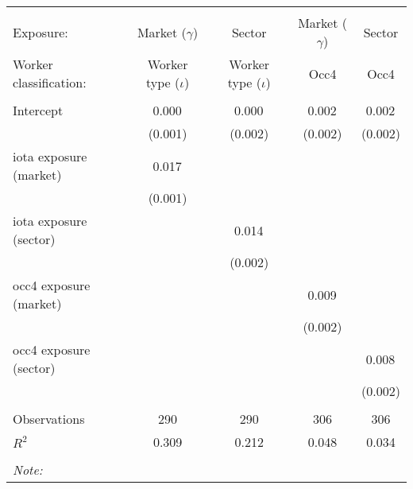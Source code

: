 \begin{tabular}{@{\extracolsep{5pt}}lcccc}
\\[-1.8ex]\hline
\hline \\[-1.8ex]
\hline \\[-1.8ex]
 Exposure: & Market ($\gamma$) & Sector & Market ($\gamma$) & Sector \\
 Worker classification: & Worker type ($\iota$) & Worker type ($\iota$) & Occ4 & Occ4 \\
 \hline &  &  &  &  \\
 Intercept & 0.000$^{}$ & 0.000$^{}$ & 0.002$^{}$ & 0.002$^{}$ \\
  & (0.001) & (0.002) & (0.002) & (0.002) \\
 iota exposure (market) & 0.017$^{}$ & & & \\
  & (0.001) & & & \\
 iota exposure (sector) & & 0.014$^{}$ & & \\
  & & (0.002) & & \\
 occ4 exposure (market) & & & 0.009$^{}$ & \\
  & & & (0.002) & \\
 occ4 exposure (sector) & & & & 0.008$^{}$ \\
  & & & & (0.002) \\
\hline \\[-1.8ex]
 Observations & 290 & 290 & 306 & 306 \\
 $R^2$ & 0.309 & 0.212 & 0.048 & 0.034 \\
\hline
\hline \\[-1.8ex]
\textit{Note:}\end{tabular}